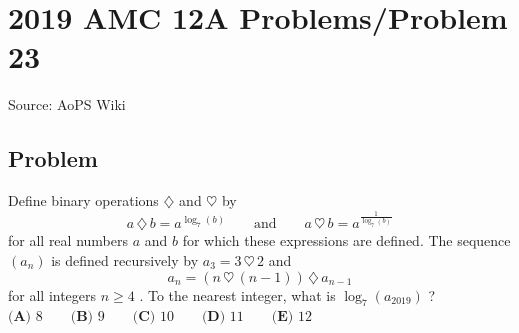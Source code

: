 \documentclass[12pt]{article}
\begin{document}
\section*{{2019 AMC 12A Problems/Problem 23}}
Source: AoPS Wiki

\subsection*{Problem}
Define binary operations $\diamondsuit$ and $\heartsuit$ by \[a \, \diamondsuit \, b = a^{\log_{7}(b)} \qquad \text{and} \qquad a \, \heartsuit \, b = a^{\frac{1}{\log_{7}(b)}}\] for all real numbers $a$ and $b$ for which these expressions are defined. The sequence $(a_n)$ is defined recursively by $a_3 = 3\, \heartsuit\, 2$ and \[a_n = (n\, \heartsuit\, (n-1)) \,\diamondsuit\, a_{n-1}\] for all integers $n \geq 4$ . To the nearest integer, what is $\log_{7}(a_{2019})$ ? $\textbf{(A) } 8 \qquad \textbf{(B) } 9 \qquad \textbf{(C) } 10 \qquad \textbf{(D) } 11 \qquad \textbf{(E) } 12$
\end{document}
